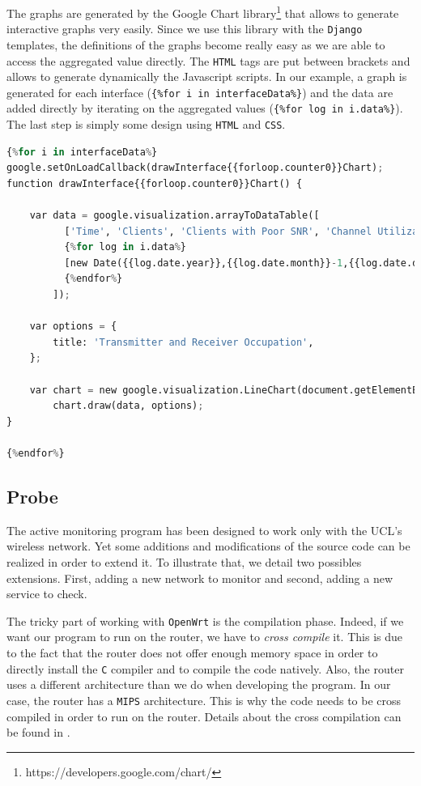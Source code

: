 The graphs are generated by the Google Chart library\footnote{https://developers.google.com/chart/} that allows to generate interactive graphs very easily. Since we use this library with the \texttt{Django} templates, the definitions of the graphs become really easy as we are able to access the aggregated value directly. The \texttt{HTML} tags are put between brackets and allows to generate dynamically the Javascript scripts. In our example, a graph is generated for each interface (\texttt{\{\%for i in interfaceData\%\}}) and the data are added directly by iterating on the aggregated values (\texttt{\{\%for log in i.data\%\}}). The last step is simply some design using \texttt{HTML} and \texttt{CSS}.\\

\begin{lstlisting}[language=Python, frame=single,breaklines=true,caption={Example of Graph definition}]
{%for i in interfaceData%}
google.setOnLoadCallback(drawInterface{{forloop.counter0}}Chart);
function drawInterface{{forloop.counter0}}Chart() {
		
	var data = google.visualization.arrayToDataTable([
		  ['Time', 'Clients', 'Clients with Poor SNR', 'Channel Utilization'],
		  {%for log in i.data%}
		  [new Date({{log.date.year}},{{log.date.month}}-1,{{log.date.day}},{{log.date.hour}},{{log.date.minute}},{{log.date.second}}), {{log.data.rxUtilization}} , {{log.data.txUtilization}}],
		  {%endfor%}
		]);

	var options = {
		title: 'Transmitter and Receiver Occupation',
	};

	var chart = new google.visualization.LineChart(document.getElementById('interface{{forloop.counter0}}chart_div'));
		chart.draw(data, options);
}

{%endfor%}
\end{lstlisting}

\subsection{Probe}
The active monitoring program has been designed to work only with the UCL's wireless network. Yet some additions and modifications of the source code can be realized in order to extend it. To illustrate that, we detail two possibles extensions. First, adding a new network to monitor and second, adding a new service to check. 

The tricky part of working with \texttt{OpenWrt} is the compilation phase. Indeed, if we want our program to run on the router, we have to \textit{cross compile} it. This is due to the fact that the router does not offer enough memory space in order to directly install the \texttt{C} compiler and to compile the code natively. Also, the router uses a different architecture than we do when developing the program. In our case, the router has a \texttt{MIPS} architecture. This is why the code needs to be cross compiled in order to run on the router. Details about the cross compilation can be found in \cite{crosscompile}.

